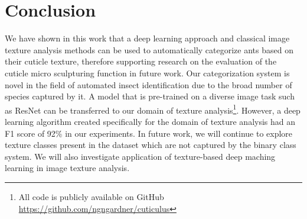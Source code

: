 \documentclass{aci}
\numberwithin{equation}{section}
\begin{document}
\section{Conclusion}
We have shown in this work that a deep learning approach and classical image
texture analysis methods can be used to automatically categorize ants based on
their cuticle texture, therefore supporting research on the evaluation of the
cuticle micro sculpturing function in future work. Our categorization system is
novel in the field of automated insect identification due to the broad number of
species captured by it. A model that is pre-trained on a diverse image task such
as ResNet can be transferred to our domain of texture analysis\footnote{All code
    is publicly available on GitHub \url{https://github.com/ngngardner/cuticulus}}.
However, a deep learning algorithm created specifically for the domain of
texture analysis had an F1 score of 92\% in our experiments. In future work, we
will continue to explore texture classes present in the dataset which are not
captured by the binary class system. We will also investigate application of
texture-based deep maching learning in image texture analysis.



\end{document}
